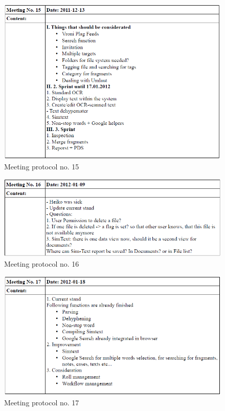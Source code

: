 \begin{appendix}
\begin{figure}
  \centering
    \includegraphics[width=\textwidth]{images/a_meetings/meeting_15.png}
  \caption{Meeting protocol no. 15}
  \label{fig:meeting protocol no. 15}
\end{figure}

\begin{figure}
  \centering
    \includegraphics[width=\textwidth]{images/a_meetings/meeting_16.png}
  \caption{Meeting protocol no. 16}
  \label{fig:meeting protocol no. 16}
\end{figure}

\begin{figure}
  \centering
    \includegraphics[width=\textwidth]{images/a_meetings/meeting_17.png}
  \caption{Meeting protocol no. 17}
  \label{fig:meeting protocol no. 17}
\end{figure}


\end{appendix}
